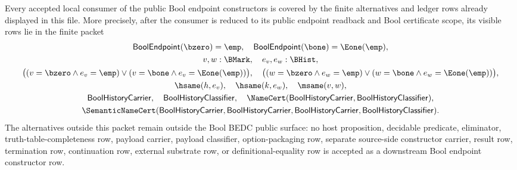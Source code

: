 \begin{lemma}
\label{lem:bool-public-endpoint-downstream-coverage}
Every accepted local consumer of the public Bool endpoint constructors is covered by the finite alternatives and ledger rows already displayed in this file. More precisely, after the consumer is reduced to its public endpoint readback and Bool certificate scope, its visible rows lie in the finite packet
$$
\begin{gathered}
\mathsf{BoolEndpoint}(\bzero)=\emp,\quad
\mathsf{BoolEndpoint}(\bone)=\Eone(\emp),\\
v,w:\BMark,\quad e_v,e_w:\BHist,\\
\bigl((v=\bzero \land e_v=\emp) \lor (v=\bone \land e_v=\Eone(\emp))\bigr),\quad
\bigl((w=\bzero \land e_w=\emp) \lor (w=\bone \land e_w=\Eone(\emp))\bigr),\\
\hsame(h,e_v),\quad \hsame(k,e_w),\quad \msame(v,w),\\
\mathsf{BoolHistoryCarrier},\quad
\mathsf{BoolHistoryClassifier},\quad
\NameCert(\mathsf{BoolHistoryCarrier},\mathsf{BoolHistoryClassifier}),\\
\SemanticNameCert(\mathsf{BoolHistoryCarrier},\mathsf{BoolHistoryCarrier},
\mathsf{BoolHistoryCarrier},\mathsf{BoolHistoryClassifier}).
\end{gathered}
$$
The alternatives outside this packet remain outside the Bool BEDC public surface: no host proposition, decidable predicate, eliminator, truth-table-completeness row, payload carrier, payload classifier, option-packaging row, separate source-side constructor carrier, result row, termination row, continuation row, external substrate row, or definitional-equality row is accepted as a downstream Bool endpoint constructor row.
\end{lemma}

